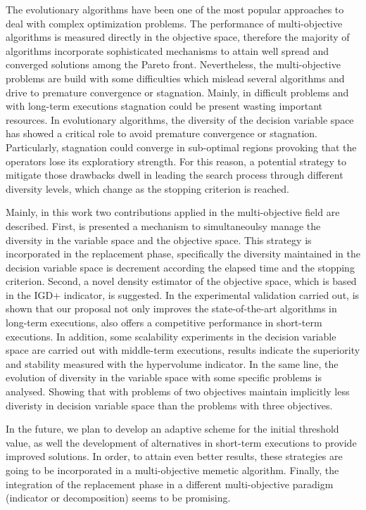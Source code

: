 The evolutionary algorithms have been one of the most popular approaches to deal with complex optimization problems.
%
The performance of multi-objective algorithms is measured directly in the objective space, therefore the majority of algorithms incorporate sophisticated mechanisms to attain well spread and converged solutions among the Pareto front.
%
Nevertheless, the multi-objective problems are build with some difficulties which mislead several algorithms and drive to premature convergence or stagnation.
%
Mainly, in difficult problems and with long-term executions stagnation could be present wasting important resources.
%
In evolutionary algorithms, the diversity of the decision variable space has showed a critical role to avoid premature convergence or stagnation.
%
Particularly, stagnation could converge in sub-optimal regions provoking that the operators lose its exploratiory strength.
%
For this reason, a potential strategy to mitigate those drawbacks dwell in leading the search process through different diversity levels, which change as the stopping criterion is reached.

Mainly, in this work two contributions applied in the multi-objective field are described.
%
First, is presented a mechanism to simultaneoulsy manage the diversity in the variable space and the objective space.
%
This strategy is incorporated in the replacement phase, specifically the diversity maintained in the decision variable space is decrement according the elapsed time and the stopping criterion.
%
Second, a novel density estimator of the objective space, which is based in the IGD+ indicator, is suggested.
%
In the experimental validation carried out, is shown that our proposal not only improves the state-of-the-art algorithms in long-term executions, also offers a competitive performance in short-term executions.
%
%
In addition, some scalability experiments in the decision variable space are carried out with middle-term executions, results indicate the superiority and stability measured with the hypervolume indicator.
%
In the same line, the evolution of diversity in the variable space with some specific problems is analysed.
%
Showing that with problems of two objectives maintain implicitly less diveristy in decision variable space than the problems with three objectives.
%


In the future, we plan to develop an adaptive scheme for the initial threshold value, as well the development of alternatives in short-term executions to provide improved solutions.
%
In order, to attain even better results, these strategies are going to be incorporated in a multi-objective memetic algorithm.
%
Finally, the integration of the replacement phase in a different multi-objective paradigm (indicator or decomposition) seems to be promising.


